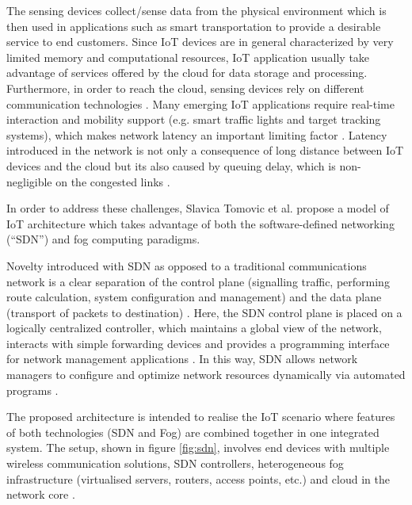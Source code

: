 \documentclass{article}
\begin{document}
The sensing devices collect/sense data from the physical environment which is then used in applications such as smart transportation to provide a desirable service to end customers. 
Since IoT devices are in general characterized by very limited memory and computational resources, IoT application usually take advantage of services offered by the cloud for data storage and processing. Furthermore, in order to reach the cloud, sensing devices rely on different communication technologies \cite{tomovic2017software}. 
Many emerging IoT applications require real-time interaction and mobility support (e.g. smart traffic lights and target tracking systems), which makes network latency an important limiting factor \cite{tomovic2017software}. Latency introduced in the network is not only a consequence of long distance between IoT devices and the cloud but its also caused by queuing delay, which is non-negligible on the congested links \cite{tomovic2017software}. 

In order to address these challenges, Slavica Tomovic et al. \cite{tomovic2017software} propose a model of IoT architecture which takes advantage of both the software-defined networking (``SDN'') and fog computing paradigms.
 
Novelty introduced with SDN as opposed to a traditional communications network is a clear separation of the control plane (signalling traffic, performing route calculation, system configuration and management) and the data plane (transport of packets to destination) \cite{tomovic2017software}. 
Here, the SDN control plane is placed on a logically centralized controller, which maintains a global view of the network, interacts with simple forwarding devices and provides a programming interface for network management applications \cite{tomovic2017software}. 
In this way, SDN allows network managers to configure and optimize network resources dynamically via automated programs \cite{tomovic2017software}.
 
The proposed architecture is intended to realise the IoT scenario where features of both technologies (SDN and Fog) are combined together in one integrated system.
The setup, shown in figure \ref{fig:sdn}, involves end devices with multiple wireless communication solutions, SDN controllers, heterogeneous fog infrastructure (virtualised servers, routers, access points, etc.) and cloud in the network core \cite{tomovic2017software}.
\end{document}
